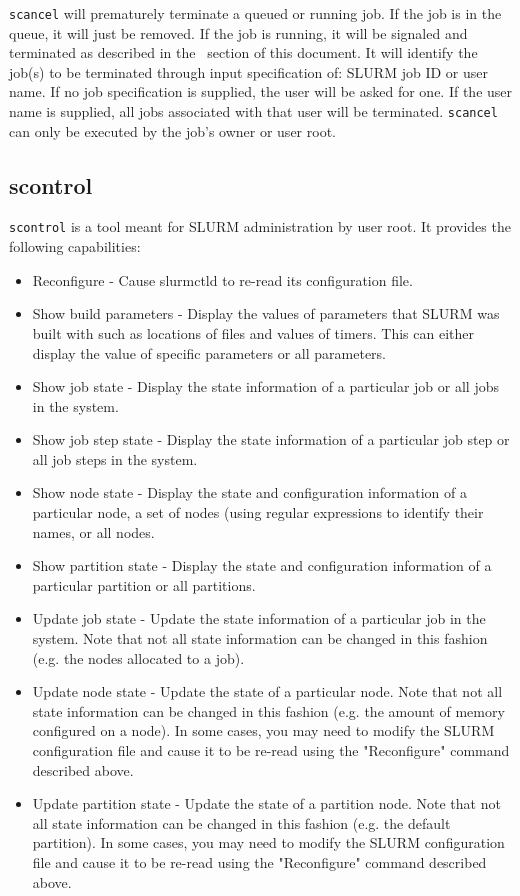 {\tt scancel} will prematurely terminate a queued or running job.
If the job is in the queue, it will just be removed.  If the job is
running, it will be signaled and terminated as described in the \slurmd\
section of this document.  It will identify the job(s) to be terminated
through input specification of: SLURM job ID or user name.  If no job
specification is supplied, the user will be asked for one.  If the user
name is supplied, all jobs associated with that user will be terminated.
{\tt scancel} can only be executed by the job's owner or user root.

\subsection{scontrol}

{\tt scontrol} is a tool meant for SLURM administration by user root. 
It provides the following capabilities:
\begin{itemize}
\item Reconfigure - Cause slurmctld to re-read its configuration file.
\item Show build parameters - Display the values of parameters that SLURM 
was built with such as locations of files and values of timers. This can 
either display the value of specific parameters or all parameters.
\item Show job state - Display the state information of a particular job 
or all jobs in the system.
\item Show job step state - Display the state information of a particular 
job step or all job steps in the system.
\item Show node state - Display the state and configuration information 
of a particular node, a set of nodes (using regular expressions to 
identify their names, or all nodes.
\item Show partition state - Display the state and configuration information 
of a particular partition or all partitions.
\item Update job state - Update the state information of a particular job 
in the system. Note that not all state information can be changed in this 
fashion (e.g. the nodes allocated to a job).
\item Update node state - Update the state of a particular node. Note that 
not all state information can be changed in this fashion (e.g. the amount 
of memory configured on a node). In some cases, you may need to modify 
the SLURM configuration file and cause it to be re-read using the "Reconfigure" 
command described above.
\item Update partition state - Update the state of a partition node. Note that 
not all state information can be changed in this fashion (e.g. the default 
partition). In some cases, you may need to modify the SLURM configuration 
file and cause it to be re-read using the "Reconfigure" command described above.
\end{itemize}

